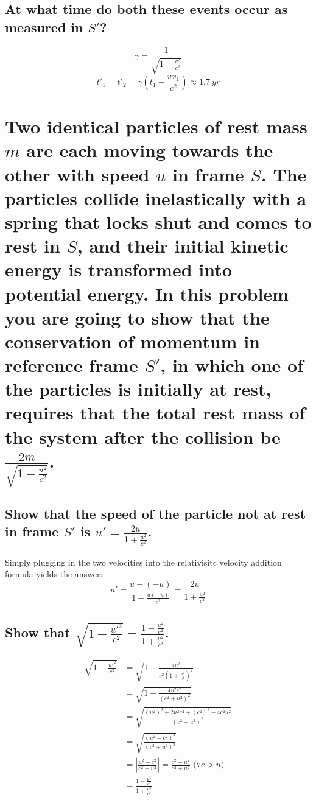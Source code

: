 \documentclass[a4paper]{scrartcl}
\begin{document}
\subsection{At what time do both these events occur as measured in \(S'\)?}
\[\gamma = \frac{1}{\sqrt{1 - \frac{v^2}{c^2}}}\]
\[t'_1 = t'_2 = \gamma \left(t_1 - \frac{v x_1}{c^2}\right) \approx \SI{1.7}{yr}\]

\section{Two identical particles of rest mass \(m\) are each moving towards the other with speed \(u\) in frame \(S\). The particles collide inelastically with a spring that locks shut and comes to rest in \(S\), and their initial kinetic energy is transformed into potential energy. In this problem you are going to show that the conservation of momentum in reference frame \(S'\), in which one of the particles is initially at rest, requires that the total rest mass of the system after the collision be \(\frac{2 m}{\sqrt{1 - \frac{u^2}{c^2}}}\).}
\subsection{Show that the speed of the particle not at rest in frame \(S'\) is \(u' = \frac{2 u}{1 + \frac{u^2}{c^2}}\).}
Simply plugging in the two velocities into the relativisitc velocity addition formula yields the answer:
\[u' = \frac{u - (-u)}{1 - \frac{u (-u)}{c^2}} = \frac{2 u}{1 + \frac{u^2}{c^2}}\]

\subsection{Show that \(\sqrt{1 - \frac{u'^2}{c^2}} = \frac{1 - \frac{u^2}{c^2}}{1 + \frac{u^2}{c^2}}\).}
\begin{align*}
    \sqrt{1 - \frac{u'^2}{c^2}} &= \sqrt{1 - \frac{4 u^2}{c^2 (1 + \frac{u^2}{c^2})^2}} \\
    &= \sqrt{1 - \frac{4 u^2 c^2}{(c^2 + u^2)^2}} \\
    &= \sqrt{\frac{(u^2)^2 + 2 u^2 c^2 + (c^2)^2 - 4 c^2 u^2}{(c^2 + u^2)^2}} \\
    &= \sqrt{\frac{(u^2 - c^2)^2}{(c^2 + u^2)^2}} \\
    &= \left|\frac{u^2 - c^2}{c^2 + u^2}\right| = \frac{c^2 - u^2}{c^2 + u^2} \text{ (}\because c > u\text{)} \\
    &= \frac{1 - \frac{u^2}{c^2}}{1 + \frac{u^2}{c^2}}
\end{align*}
\end{document}
